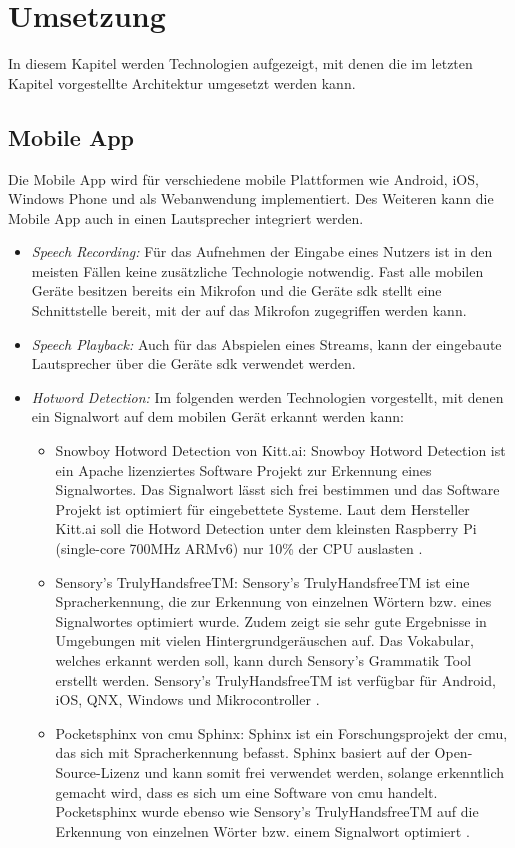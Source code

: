 \section{Umsetzung}
In diesem Kapitel werden Technologien aufgezeigt, mit denen die im letzten Kapitel vorgestellte Architektur umgesetzt werden kann. 

\subsection{Mobile App}
Die Mobile App wird für verschiedene mobile Plattformen wie Android, iOS, Windows Phone und als Webanwendung implementiert. Des Weiteren kann die Mobile App auch in einen Lautsprecher integriert werden. 
\begin{itemize}
	\item \textsl{Speech Recording:} Für das Aufnehmen der Eingabe eines Nutzers ist in den meisten Fällen keine zusätzliche Technologie notwendig. Fast alle mobilen Geräte besitzen bereits ein Mikrofon und die Geräte \acs{sdk} stellt eine Schnittstelle bereit, mit der auf das Mikrofon zugegriffen werden kann.
	\item \textsl{Speech Playback:} Auch für das Abspielen eines Streams, kann der eingebaute Lautsprecher über die Geräte \acs{sdk} verwendet werden.
	\item \textsl{Hotword Detection:} Im folgenden werden Technologien vorgestellt, mit denen ein Signalwort auf dem mobilen Gerät erkannt werden kann: 
	\begin{itemize}
		\item Snowboy Hotword Detection von Kitt.ai: Snowboy Hotword Detection ist ein Apache lizenziertes Software Projekt zur Erkennung eines Signalwortes. Das Signalwort lässt sich frei bestimmen und das Software Projekt ist optimiert für eingebettete Systeme. Laut dem Hersteller Kitt.ai soll die Hotword Detection unter dem kleinsten Raspberry Pi (single-core 700MHz ARMv6) nur 10\% der CPU
		auslasten \cite{SnowboyHotwordDetection}.
		\item Sensory's TrulyHandsfreeTM: Sensory's TrulyHandsfreeTM ist eine Spracherkennung, die zur Erkennung von einzelnen Wörtern bzw. eines Signalwortes optimiert wurde. Zudem zeigt sie sehr gute Ergebnisse in Umgebungen mit vielen Hintergrundgeräuschen auf. Das Vokabular, welches erkannt werden soll, kann durch Sensory's Grammatik Tool erstellt werden. Sensory's TrulyHandsfreeTM ist verfügbar für Android, iOS, QNX, Windows und Mikrocontroller \cite{TrulyHandsfreeTM}.
		\item Pocketsphinx von \acs{cmu} Sphinx: Sphinx ist ein Forschungsprojekt der \ac{cmu}, das sich mit Spracherkennung befasst. Sphinx basiert auf der Open-Source-Lizenz und kann somit frei verwendet werden, solange erkenntlich gemacht wird, dass es sich um eine Software von \ac{cmu} handelt. Pocketsphinx wurde ebenso wie Sensory's TrulyHandsfreeTM auf die Erkennung von einzelnen Wörter bzw. einem Signalwort optimiert \cite{Pocketsphinx}.
	\end{itemize}
\end{itemize}

